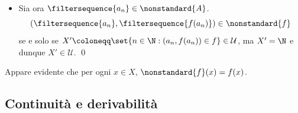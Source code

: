 {\begin{itemize}
        Si definisca dunque una successione $ \sequence{c_{n} } $: \begin{equation*}
            c_{n}= \begin{cases}
                b_{n} & n \in X\\ 
                f(a_{n}) & n \notin X 
            \end{cases} 
        \end{equation*}allora $ \filtersequence{c_{n}}=\filtersequence{b_{n}} $ poiché $ X \in \mathcal{U} $, e \begin{equation*}
            \forall\, n \in \N:\, c_{n} = f(a_{n}). 
        \end{equation*}Inoltre, per la Proposizione , $ \filtersequence{a_{n}} \in \nonstandard{A} $, e pertanto \begin{equation*}
            \left(\filtersequence{a_{n} }, \filtersequence{b_{n} }\right) \in \set{\left(\filtersequence{a_{n}}, \filtersequence{f(a_{n} )}\right): \filtersequence{a_{n}} \in \nonstandard{A}}.
        \end{equation*}
        \item[\boxed{\supseteq}] Sia ora $ \filtersequence{a_{n}} \in \nonstandard{A} $. \begin{equation*}
            \left(\filtersequence{a_{n}}, \filtersequence{f(a_{n} )}\right) \in \nonstandard{f}
        \end{equation*}se e solo se $ X'\coloneqq\set{n \in \N: \left(a_{n}, f(a_{n} ) \right) \in f} \in \mathcal{U} $, ma $ X' = \N $ e dunque $ X' \in \mathcal{U} $.
    \qed\end{itemize}
}

Appare evidente che per ogni $ x \in X $, $ \nonstandard{f}(x)=f(x) $.

\subsection{Continuità e derivabilità}

